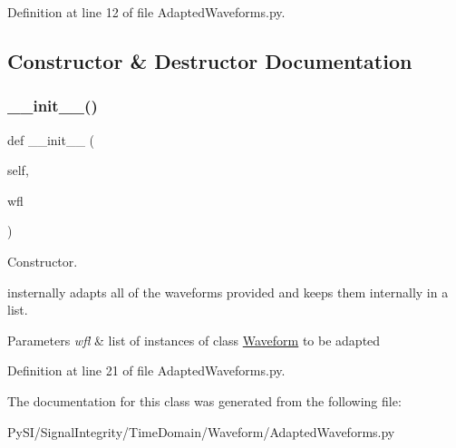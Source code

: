 Definition at line 12 of file Adapted\+Waveforms.\+py.



\subsection{Constructor \& Destructor Documentation}
\mbox{\label{classSignalIntegrity_1_1TimeDomain_1_1Waveform_1_1AdaptedWaveforms_1_1AdaptedWaveforms_a15e87afe4d8ac1102a3665f80cb0611a}} 
\subsubsection{\texorpdfstring{\+\_\+\+\_\+init\+\_\+\+\_\+()}{\_\_init\_\_()}}
{\footnotesize\ttfamily def \+\_\+\+\_\+init\+\_\+\+\_\+ (\begin{DoxyParamCaption}\item[{}]{self,  }\item[{}]{wfl }\end{DoxyParamCaption})}



Constructor. 

insternally adapts all of the waveforms provided and keeps them internally in a list.


\begin{DoxyParams}{Parameters}
{\em wfl} & list of instances of class \hyperlink{namespaceSignalIntegrity_1_1TimeDomain_1_1Waveform_1_1Waveform}{Waveform} to be adapted \\
\hline
\end{DoxyParams}


Definition at line 21 of file Adapted\+Waveforms.\+py.



The documentation for this class was generated from the following file\+:\begin{DoxyCompactItemize}
\item 
Py\+S\+I/\+Signal\+Integrity/\+Time\+Domain/\+Waveform/Adapted\+Waveforms.\+py\end{DoxyCompactItemize}
